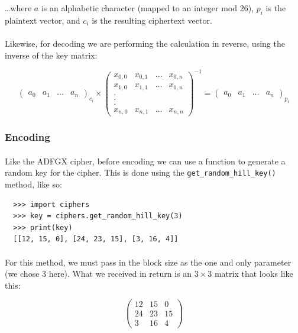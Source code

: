 \documentclass[12pt,a4paper]{article}
\begin{document}
\ldots where $a$ is an alphabetic character (mapped to an integer mod 26), 
$p_i$ is the plaintext vector, and $c_i$ is the resulting ciphertext vector.

\paragraph{}
Likewise, for decoding we are performing the calculation in reverse, using the 
inverse of the key matrix:

$$
\begin{pmatrix}
  a_0 & a_1 & \ldots & a_n
\end{pmatrix}
_{c_i} \times
\begin{pmatrix}
  x_{0,0} & x_{0,1} & \ldots & x_{0,n}\\
  x_{1,0} & x_{1,1} & \ldots & x_{1,n}\\
  . \\
  . \\
  . \\
  x_{n,0} & x_{n,1} & \ldots & x_{n,n}
\end{pmatrix}
^{-1} =
\begin{pmatrix}
  a_0 & a_1 & \ldots & a_n
\end{pmatrix}
_{p_i}
$$

\subsubsection{Encoding}
\paragraph{}
Like the ADFGX cipher, before encoding we can use a function to generate 
a random key for the cipher.  This is done using the 
\verb|get_random_hill_key()| method, like so:

\begin{verbatim}
  >>> import ciphers
  >>> key = ciphers.get_random_hill_key(3)
  >>> print(key)
  [[12, 15, 0], [24, 23, 15], [3, 16, 4]]
\end{verbatim}

\paragraph{}
For this method, we must pass in the block size as the one and only parameter 
(we chose $3$ here).  What we received in return is an $3 \times 3$ matrix 
that looks like this:

$$
\begin{pmatrix}
  12 & 15 & 0 \\
  24 & 23 & 15 \\
  3 & 16 & 4
\end{pmatrix}
$$
\end{document}
